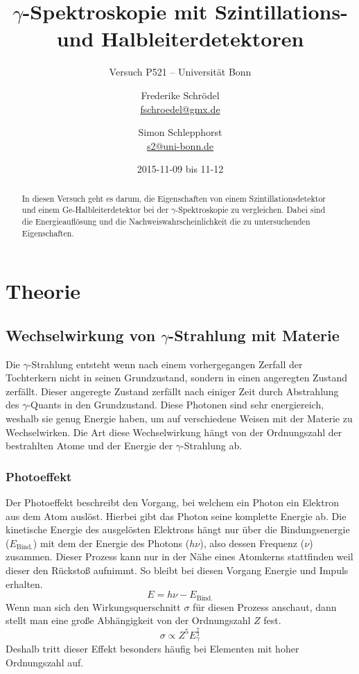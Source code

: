 \documentclass[11pt, ngerman, fleqn, DIV=15, headinclude, BCOR=2cm]{scrreprt}
\title{$\gamma$-Spektroskopie mit Szintillations- und Halbleiterdetektoren}
\subtitle{Versuch P521 -- Universität Bonn}
\author{
	Frederike Schrödel \\
	\small{\href{mailto:fschroedel@gmx.de}{fschroedel@gmx.de}}
	\and
	Simon Schlepphorst \\
	\small{\href{mailto:s2@uni-bonn.de}{s2@uni-bonn.de}}
}
\date{2015-11-09 bis 11-12}
\begin{document}
\maketitle

\begin{abstract}
    In diesen Versuch geht es darum, die Eigenschaften von einem
    Szintillationsdetektor und einem Ge-Halbleiterdetektor bei der
    $\gamma$-Spektroskopie zu vergleichen.
    Dabei sind die Energieauflösung und die Nachweiswahrscheinlichkeit die
    zu untersuchenden Eigenschaften.
\end{abstract}


\tableofcontents

\chapter{Theorie}

\section{Wechselwirkung von $\gamma$-Strahlung mit Materie}

Die $\gamma$-Strahlung entsteht wenn nach einem vorhergegangen Zerfall der
Tochterkern nicht in seinen Grundzustand, sondern in einen angeregten Zustand
zerfällt.
Dieser angeregte Zustand zerfällt nach einiger Zeit durch Abstrahlung des
$\gamma$-Quants in den Grundzustand. Diese Photonen sind sehr energiereich,
weshalb sie genug Energie haben, um auf verschiedene Weisen mit der Materie zu
Wechselwirken.
Die Art diese Wechselwirkung hängt von der Ordnungszahl der bestrahlten Atome
und der Energie der $\gamma$-Strahlung ab.

\subsection{Photoeffekt}

Der Photoeffekt beschreibt den Vorgang, bei welchem ein Photon ein Elektron aus
dem Atom auslöst.
Hierbei gibt das Photon seine komplette Energie ab.
Die kinetische Energie des ausgelösten Elektrons hängt nur über die
Bindungsenergie ($E_\text{Bind.}$) mit dem der Energie des Photons ($h\nu$),
also dessen Frequenz ($\nu$) zusammen.
Dieser Prozess kann nur in der Nähe eines Atomkerns stattfinden weil dieser
den Rückstoß aufnimmt.
So bleibt bei diesen Vorgang Energie und Impuls erhalten. 
\[ 
    E = h\nu - E_\text{Bind.}
\]
Wenn man sich den Wirkungsquerschnitt $\sigma$ für diesen Prozess anschaut,
dann stellt man eine große Abhängigkeit von der Ordnungszahl $Z$ fest.
\[
    \sigma \propto Z^5 E_\gamma^{\frac 72}
\]
Deshalb tritt dieser Effekt besonders häufig bei Elementen mit hoher Ordnungszahl
auf.
\end{document}
